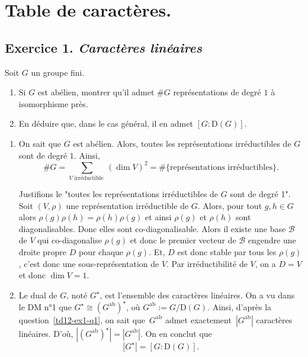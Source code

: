 \documentclass[./main]{subfiles}
\begin{document}
  \chapter{Table de caractères.}
  \minitoc

  \section{Exercice 1. \textit{Caractères linéaires}}
  \label{td12-ex1}

  \begin{enonce}
    Soit $G$ un groupe fini.
    \begin{enumerate}
      \item Si $G$ est abélien, montrer qu'il admet $\#G$ représentations de degré $1$ à isomorphisme près.
      \item En déduire que, dans le cas général, il en admet $[G : \mathrm{D}(G)]$.
    \end{enumerate}
  \end{enonce}

  \begin{enumerate}
    \item On sait que $G$ est abélien. \label{td12-ex1-q1}
      Alors, toutes les représentations irréductibles de $G$ sont de degré $1$.
      Ainsi, \[
      \# G = \sum_{V \text{ irréductible }} (\dim V)^2 = \# \{\text{représentations irréductibles}\} 
      .\]

      Justifions le "toutes les représentations irréductibles de $G$ sont de degré 1".
      Soit $(V, \rho)$ une représentation irréductible de  $G$.
      Alors, pour tout $g, h \in G$ alors $\rho(g)\rho(h) = \rho(h)\rho(g)$ et ainsi  $\rho(g)$ et  $\rho(h)$ sont diagonalisables.
      Donc elles sont co-diagonalisable.
      Alors il existe une base $\mathcal{B}$ de $V$ qui co-diagonalise $\rho(g)$ et donc le premier vecteur de $\mathcal{B}$ engendre une droite propre $D$ pour chaque $\rho(g)$.
      Et,  $D$ est donc stable par tous les $\rho(g)$, c'est donc une sous-représentation de $V$.
      Par irréductibilité de $V$, on a $D = V$ et donc $\dim V = 1$.
    \item Le dual de $G$, noté $G^\star$, est l'ensemble des caractères linéaires.
      On a vu dans le DM n°1 que $G^\star \cong (G^\mathrm{ab})^\star$, où $G^\mathrm{ab} := G / \mathrm{D}(G)$.
      Ainsi, d'après la question~\ref{td12-ex1-q1}, on sait que~$G^\mathrm{ab}$ admet exactement~$|G^\mathrm{ab}|$ caractères linéaires.
      D'où, $|(G^\mathrm{ab})^\star| = |G^\mathrm{ab}|$. On en conclut que \[
        |G^\star| = [G : \mathrm{D}(G)]
      .\] 
  \end{enumerate}
\end{document}
